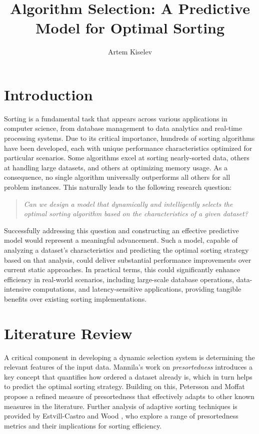 \documentclass[twocolumn]{article}
\title{Algorithm Selection: A Predictive Model for Optimal Sorting}
\author{Artem Kiselev}
\begin{document}
\maketitle

\section{Introduction}
Sorting is a fundamental task that appears across various applications in computer science, from database management to data analytics and real-time processing systems. Due to its critical importance, hundreds of sorting algorithms have been developed, each with unique performance characteristics optimized for particular scenarios. Some algorithms excel at sorting nearly-sorted data, others at handling large datasets, and others at optimizing memory usage. As a consequence, no single algorithm universally outperforms all others for all problem instances. This naturally leads to the following research question:

\begin{quote}
\emph{Can we design a model that dynamically and intelligently selects the optimal sorting algorithm based on the characteristics of a given dataset?}
\end{quote}

Successfully addressing this question and constructing an effective predictive model would represent a meaningful advancement. Such a model, capable of analyzing a dataset's characteristics and predicting the optimal sorting strategy based on that analysis, could deliver substantial performance improvements over current static approaches. In practical terms, this could significantly enhance efficiency in real-world scenarios, including large-scale database operations, data-intensive computations, and latency-sensitive applications, providing tangible benefits over existing sorting implementations.

\section{Literature Review}
A critical component in developing a dynamic selection system is determining the relevant features of the input data. Mannila's work on \textit{presortedness} \cite{Mannila1985MeasuresOP} introduces a key concept that quantifies how ordered a dataset already is, which in turn helps to predict the optimal sorting strategy. Building on this, Petersson and Moffat \cite{PETERSSON1995153} propose a refined measure of presortedness that effectively adapts to other known measures in the literature. Further analysis of adaptive sorting techniques is provided by Estvill-Castro and Wood \cite{adaptivesortingsurvey}, who explore a range of presortedness metrics and their implications for sorting efficiency.
\end{document}
